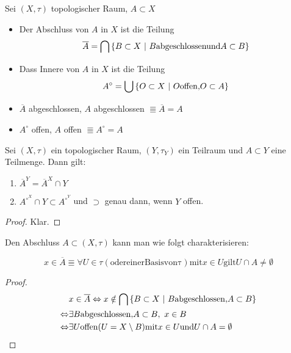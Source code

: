 \documentclass{skript}
\begin{document}
\begin{dfn}
    Sei $(X,\tau)$ topologischer Raum, $A\subset X$
    \begin{itemize}
        \item Der Abschluss von $A$ in $X$ ist die Teilung
            \[\overline{A} = \bigcap\mdef[B\subset X]{B \mathrm{ abgeschlossen und }
            A\subset B}\]
        \item Dass Innere von $A$ in $X$ ist die Teilung
            \[A^\circ = \bigcup\mdef[O\subset X]{O\mathrm{ offen, } O\subset A}\]
    \end{itemize}
    \begin{bem}
        \begin{itemize}
            \item $\overline{A}$ abgeschlossen, $A$ abgeschlossen $\Equiv
                \overline{A} = A$
            \item $A^\circ$ offen, $A$ offen $\Equiv A^\circ = A$
        \end{itemize}
    \end{bem}
\end{dfn}

\begin{stz}
    Sei $(X,\tau)$ ein topologischer Raum, $(Y,\tau_Y)$ ein Teilraum und $A\subset Y$
    eine Teilmenge. Dann gilt:
    \begin{enumerate}
        \item $\overline{A}^Y = \overline{A}^X \cap Y$
        \item $A^{\circ^X} \cap Y \subset A^{\circ^Y}$ und $\supset$ genau dann, wenn
            $Y$ offen.
    \end{enumerate}
    \begin{proof}
        Klar.
    \end{proof}
\end{stz}

\begin{stz}
    Den Abschluss $A\subset(X,\tau)$ kann man wie folgt charakterisieren:
    
    \[x\in \overline{A} \Equiv \forall U\in \tau\mathrm{ (oder einer Basis von
    \tau) mit } x\in U \mathrm{ gilt } U\cap A \neq \emptyset\]
    \begin{proof}
        \begin{align*}
            & x\in\overline{A} \Equiv x\notin
            \bigcap \mdef[B\subset X]{B \mathrm{ abgeschlossen, } A\subset B} \\
            \Equiv & \exists B \mathrm{ abgeschlossen, } A\subset B,\ x\in B \\
            \Equiv & \exists U \mathrm{ offen (}U = X\setminus B\mathrm{) mit } x\in U
            \mathrm{ und } U\cap A = \emptyset
        \end{align*}
    \end{proof}
\end{stz}
\end{document}
